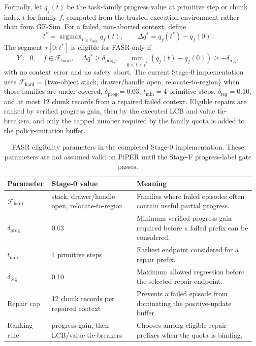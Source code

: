 \documentclass[10pt]{article}
\theoremstyle{plain}
\theoremstyle{definition}
\theoremstyle{remark}
\newcommand{\argmax}{\mathop{\mathrm{argmax}}}
\begin{document}
Formally, let $q_f(t)$ be the task-family progress value at primitive step or chunk index $t$ for family $f$, computed from the trusted execution environment rather than from GE-Sim. For a failed, non-aborted context, define
\[
t^*=\argmax_{t\ge t_{\min}} q_f(t),\qquad \Delta q^*=q_f(t^*)-q_f(0).
\]
The segment $\tau[0:t^*]$ is eligible for FASR only if
\[
Y=0,\quad f\in\mathcal F_{\mathrm{hard}},\quad \Delta q^*\ge \delta_{\mathrm{prog}},\quad
\min_{0\le t\le t^*} (q_f(t)-q_f(0))\ge -\delta_{\mathrm{reg}},
\]
with no context error and no safety abort. The current Stage-0 implementation uses $\mathcal F_{\mathrm{hard}}=\{$two-object stack, drawer/handle open, relocate-to-region$\}$ when those families are under-covered, $\delta_{\mathrm{prog}}=0.03$, $t_{\min}=4$ primitive steps, $\delta_{\mathrm{reg}}=0.10$, and at most 12 chunk records from a repaired failed context. Eligible repairs are ranked by verified progress gain, then by the executed LCB and value tie-breakers, and only the capped number required by the family quota is added to the policy-imitation buffer.

\begin{table}[H]
\centering
\small
\caption{FASR eligibility parameters in the completed Stage-0 implementation. These parameters are not assumed valid on PiPER until the Stage-F progress-label gate passes.\label{tab:fasr_params}}
\begin{tabularx}{\linewidth}{@{}p{3.0cm}p{3.6cm}X@{}}
\toprule
Parameter & Stage-0 value & Meaning \\
\midrule
$\mathcal F_{\mathrm{hard}}$ & stack, drawer/handle open, relocate-to-region & Families where failed episodes often contain useful partial progress. \\
$\delta_{\mathrm{prog}}$ & 0.03 & Minimum verified progress gain required before a failed prefix can be considered. \\
$t_{\min}$ & 4 primitive steps & Earliest endpoint considered for a repair prefix. \\
$\delta_{\mathrm{reg}}$ & 0.10 & Maximum allowed regression before the selected repair endpoint. \\
Repair cap & 12 chunk records per repaired context & Prevents a failed episode from dominating the positive-update buffer. \\
Ranking rule & progress gain, then LCB/value tie-breakers & Chooses among eligible repair prefixes when the quota is binding. \\
\bottomrule
\end{tabularx}
\end{table}
\end{document}
